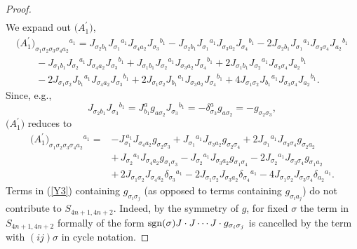 \documentclass[pdftex]{sigma}
\numberwithin{equation}{section}
\theoremstyle{definition}
\newcommand{\sgn}{{\rm sgn}}
\begin{document}
\begin{proof}
\begin{gather*}
\end{gather*}
We expand out $\bigl(A_1^\prime\bigr)$,
\begin{gather*}
{\bigl({A_1^\prime}\bigr)_{\sigma_1 \sigma_2 \sigma_3 \sigma_4 a_2}{}^{a_1} }
= J_{\sigma_2 b_1} J_{\sigma_1}{}^{a_1} J_{\sigma_4 a_2} J_{\sigma_3}{}^{b_1}
 -J_{\sigma_2 b_1} J_{\sigma_1}{}^{a_1} J_{\sigma_3 a_2} J_{\sigma_4}{}^{b_1}
 -2 J_{\sigma_2 b_1} J_{\sigma_1}{}^{a_1} J_{\sigma_3 \sigma_4} J_{a_2}{}^{b_1} \\ \nonumber
\qquad{}
 -J_{\sigma_1 b_1} J_{\sigma_2}{}^{a_1} J_{\sigma_4 a_2} J_{\sigma_3}{}^{b_1}
 +J_{\sigma_1 b_1} J_{\sigma_2}{}^{a_1} J_{\sigma_3 a_2} J_{\sigma_4}{}^{b_1}
 +2 J_{\sigma_1 b_1} J_{\sigma_2}{}^{a_1} J_{\sigma_3 \sigma_4} J_{a_2}{}^{b_1}
\\ \nonumber
\qquad{}
 -2J_{\sigma_1 \sigma_2} J_{b_1}{}^{a_1} J_{\sigma_4 a_2} J_{\sigma_3}{}^{b_1}
 +2J_{\sigma_1 \sigma_2} J_{b_1}{}^{a_1} J_{\sigma_3 a_2} J_{\sigma_4}{}^{b_1}
 +4 J_{\sigma_1 \sigma_2} J_{b_1}{}^{a_1} J_{\sigma_3 \sigma_4} J_{a_2}{}^{b_1 }.
 \end{gather*}
Since, e.g.,
\begin{equation}\label{eq:minus}
J_{\sigma_2 b_1}J_{\sigma_3}{}^{b_1} = J^{a}_{b_1} g_{a\sigma_2}J_{\sigma_3}{}^{b_1}
= -\delta^a_{\sigma_3} g_{a\sigma_2} =- g_{\sigma_2 \sigma_3},
\end{equation}
$\bigl(A_1^\prime\bigr)$ reduces to
\begin{align}
\bigl({A_1^\prime}\bigr)_{\sigma_1 \sigma_2 \sigma_3 \sigma_4 a_2}{}^{a_1}
={}& {-}J_{\sigma_1}^{\ a_1} J_{\sigma_4 a_2} g_{\sigma_2 \sigma_3}
+J_{\sigma_1}{}^{a_1} J_{\sigma_3 a_2} g_{\sigma_2 \sigma_4}
+2 J_{\sigma_1}{}^{a_1} J_{\sigma_3 \sigma_4} g_{\sigma_2 a_2}
 \nonumber\\
&{+}\, J_{\sigma_2}{}^{a_1} J_{\sigma_4 a_2} g_{\sigma_1 \sigma_3}
- J_{\sigma_2}{}^{a_1} J_{\sigma_3 a_2} g_{\sigma_1 \sigma_4}
-2 J_{\sigma_2}{}^{a_1} J_{\sigma_3 \sigma_4} g_{\sigma_1 a_2}\nonumber
\\
&{+}\, 2J_{\sigma_1 \sigma_2} J_{\sigma_4 a_2}\delta_{\sigma_3}{}^{a_1}
-2J_{\sigma_1 \sigma_2} J_{\sigma_3 a_2}\delta_{\sigma_4}{}^{a_1}
-4J_{\sigma_1 \sigma_2} J_{\sigma_3 \sigma_4}\delta_{a_2}{}^{a_1}.\label{Y3}
\end{align}
Terms in (\ref{Y3}) containing $g_{\sigma_i\sigma_j}$ (as opposed to terms containing
$g_{\sigma_i a_j}$) do not contribute to $S_{4n+1,4n+2}$. Indeed, by the symmetry of $g$,
for fixed $\sigma$ the term in $S_{4n+1,4n+2}$ formally of the form
$\sgn(\sigma) J\cdot J\cdots J\cdot g_{\sigma_i\sigma_j}$ is
 cancelled by the term with
$ (ij)\sigma$ in cycle notation.


\end{proof}
\end{document}
